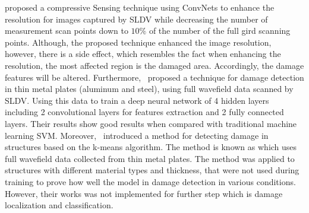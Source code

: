 \textcite{esfandabadideep} proposed a compressive Sensing technique using ConvNets to enhance the resolution for images captured by SLDV while decreasing the number of measurement scan points down to \(10\%\) of the number of the full gird scanning points. 
Although, the proposed technique enhanced the image resolution, however, there is a side effect, which resembles the fact when enhancing the resolution, the most affected region is the damaged area. 
Accordingly, the damage features will be altered.
Furthermore,~\textcite{Melville2018} proposed a technique for damage detection in thin metal plates (aluminum and steel), using full wavefield data scanned by SLDV. 
Using this data to train a deep neural network of 4 hidden layers including 2 convolutional layers for features extraction and 2 fully connected layers. Their results show good results when compared with traditional machine learning SVM.
Moreover,~\textcite{Melville2017} introduced a method for detecting damage in structures based on the k-means algorithm. 
The method is known as  which uses full wavefield data collected from thin metal plates. 
The method was applied to structures with different material types and thickness, that were not used during training to prove how well the model in damage detection in various conditions. 
However, their works was not implemented for further step which is damage localization and classification.

